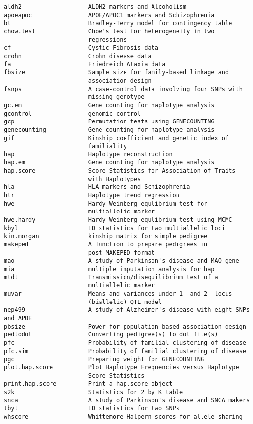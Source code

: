 \documentclass[10pt,a4paper]{article}
\begin{document}
\begin{verbatim}
aldh2                   ALDH2 markers and Alcoholism
apoeapoc                APOE/APOC1 markers and Schizophrenia
bt                      Bradley-Terry model for contingency table
chow.test               Chow's test for heterogeneity in two
                        regressions
cf                      Cystic Fibrosis data
crohn                   Crohn disease data
fa                      Friedreich Ataxia data
fbsize                  Sample size for family-based linkage and
                        association design
fsnps                   A case-control data involving four SNPs with
                        missing genotype
gc.em                   Gene counting for haplotype analysis
gcontrol                genomic control
gcp                     Permutation tests using GENECOUNTING
genecounting            Gene counting for haplotype analysis
gif                     Kinship coefficient and genetic index of
                        familiality
hap                     Haplotype reconstruction
hap.em                  Gene counting for haplotype analysis
hap.score               Score Statistics for Association of Traits
                        with Haplotypes
hla                     HLA markers and Schizophrenia
htr                     Haplotype trend regression
hwe                     Hardy-Weinberg equlibrium test for
                        multiallelic marker
hwe.hardy               Hardy-Weinberg equlibrium test using MCMC
kbyl                    LD statistics for two multiallelic loci
kin.morgan              kinship matrix for simple pedigree
makeped                 A function to prepare pedigrees in
                        post-MAKEPED format
mao                     A study of Parkinson's disease and MAO gene
mia                     multiple imputation analysis for hap
mtdt                    Transmission/disequilibrium test of a
                        multiallelic marker
muvar                   Means and variances under 1- and 2- locus
                        (biallelic) QTL model
nep499                  A study of Alzheimer's disease with eight SNPs and APOE
pbsize                  Power for population-based association design
pedtodot                Converting pedigree(s) to dot file(s)
pfc                     Probability of familial clustering of disease
pfc.sim                 Probability of familial clustering of disease
pgc                     Preparing weight for GENECOUNTING
plot.hap.score          Plot Haplotype Frequencies versus Haplotype
                        Score Statistics
print.hap.score         Print a hap.score object
s2k                     Statistics for 2 by K table
snca                    A study of Parkinson's disease and SNCA makers
tbyt                    LD statistics for two SNPs
whscore                 Whittemore-Halpern scores for allele-sharing
\end{verbatim}
\end{document}
